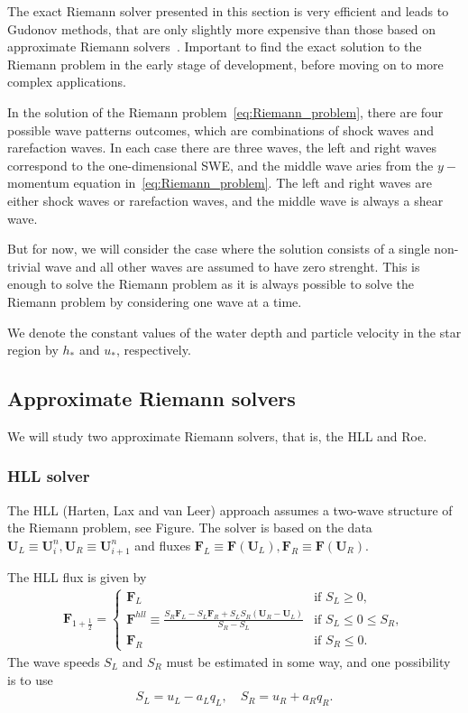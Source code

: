The exact Riemann solver presented in this section is very efficient and leads to Gudonov methods, that are only slightly more expensive than those based on approximate Riemann solvers~\cite{Toro2001-Shock}.
Important to find the exact solution to the Riemann problem in the early stage of development, before moving on to more complex applications.


In the solution of the Riemann problem~\eqref{eq:Riemann_problem}, there are four possible wave patterns outcomes, which are combinations of shock waves and rarefaction waves.
In each case there are three waves, the left and right waves correspond to the one-dimensional SWE, and the middle wave aries from the $y-$momentum equation in~\eqref{eq:Riemann_problem}.
The left and right waves are either shock waves or rarefaction waves, and the middle wave is always a shear wave.

But for now, we will consider the case where the solution consists of a single non-trivial wave and all other waves are assumed to have zero strenght.
This is enough to solve the Riemann problem as it is always possible to solve the Riemann problem by considering one wave at a time.

We denote the constant values of the water depth and particle velocity in the star region by $h_*$ and $u_*$, respectively.

\subsection{Approximate Riemann solvers}
We will study two approximate Riemann solvers, that is, the HLL and Roe. 

\subsubsection{HLL solver}
The HLL (Harten, Lax and van Leer) approach assumes a two-wave structure of the Riemann problem, see Figure.
The solver is based on the data $\mathbf{U}_L \equiv \mathbf{U}_i^n, \mathbf{U}_R \equiv \mathbf{U}_{i+1}^n$ and fluxes $\mathbf{F}_L \equiv \mathbf{F}(\mathbf{U}_L), \mathbf{F}_R \equiv \mathbf{F}(\mathbf{U}_R)$.

The HLL flux is given by
\begin{align*}
    \mathbf{F}_{1 + \frac{1}{2}} = \begin{cases}
        \mathbf{F}_L & \text{if } S_L \geq 0, \\
        \mathbf{F}^{hll} \equiv \frac{S_R \mathbf{F}_L - S_L \mathbf{F}_R + S_L S_R (\mathbf{U}_R - \mathbf{U}_L)}{S_R - S_L} & \text{if } S_L \leq 0 \leq S_R, \\
        \mathbf{F}_R & \text{if } S_R \leq 0.
    \end{cases}
\end{align*}
The wave speeds $S_L$ and $S_R$ must be estimated in some way, and one possibility is to use 
\begin{align*}
    S_L = u_L - a_L q_L, \quad S_R = u_R + a_R q_R.
\end{align*}

